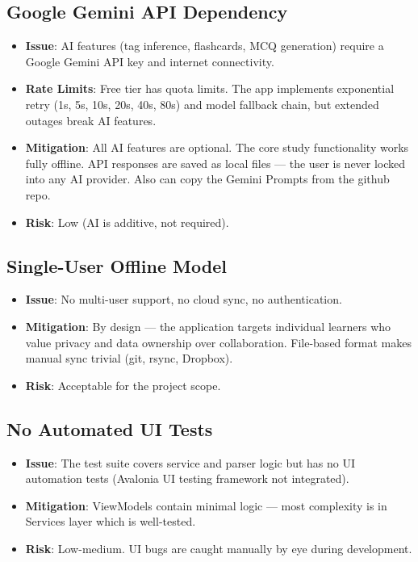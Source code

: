 \documentclass[14pt]{article}
\begin{document}
\newpage
\subsection{Google Gemini API Dependency}
\label{sec:org42ec541}
\begin{itemize}
\item \textbf{\textbf{Issue}}: AI features (tag inference, flashcards, MCQ generation)
require a Google Gemini API key and internet connectivity.
\item \textbf{\textbf{Rate Limits}}: Free tier has quota limits. The app implements
exponential retry (1s, 5s, 10s, 20s, 40s, 80s) and model fallback
chain, but extended outages break AI features.
\item \textbf{\textbf{Mitigation}}: All AI features are optional. The core study
functionality works fully offline. API responses are saved as local
files — the user is never locked into any AI provider. Also can copy
the Gemini Prompts from the github repo.
\item \textbf{\textbf{Risk}}: Low (AI is additive, not required).
\end{itemize}
\subsection{Single-User Offline Model}
\label{sec:orgc03e5fe}
\begin{itemize}
\item \textbf{\textbf{Issue}}: No multi-user support, no cloud sync, no authentication.
\item \textbf{\textbf{Mitigation}}: By design — the application targets individual
learners who value privacy and data ownership over collaboration.
File-based format makes manual sync trivial (git, rsync, Dropbox).
\item \textbf{\textbf{Risk}}: Acceptable for the project scope.
\end{itemize}

\newpage
\subsection{No Automated UI Tests}
\label{sec:org6f36bb8}
\begin{itemize}
\item \textbf{\textbf{Issue}}: The test suite covers service and parser logic but has
no UI automation tests (Avalonia UI testing framework not integrated).
\item \textbf{\textbf{Mitigation}}: ViewModels contain minimal logic — most complexity
is in Services layer which is well-tested.
\item \textbf{\textbf{Risk}}: Low-medium. UI bugs are caught manually by eye during development.
\end{itemize}
\end{document}
